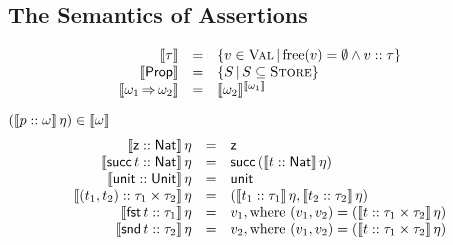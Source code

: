 \documentclass[12pt,a4paper]{article}
\begin{document}
\subsection{The Semantics of Assertions}

\begin{definition}
  \[\begin{array}{rcl}
  \llbracket\tau\rrbracket &=& \{v\in\textsc{Val}\,|\,\mathrm{free}(v)=\emptyset \wedge {v}\mathrel{::}{\tau}\} \\
  \llbracket\mathsf{Prop}\rrbracket &=& \{S\,|\,S \subseteq \textsc{Store}\} \\
  \llbracket\omega_1 \operatorname{\Rightarrow} \omega_2\rrbracket &=& \llbracket\omega_2\rrbracket^{\llbracket\omega_1\rrbracket}
  \end{array}\]
\end{definition}

$(\llbracket{p}\mathrel{::}{\omega}\rrbracket\,\eta) \in \llbracket\omega\rrbracket$
\[\begin{array}{rcl}
  \llbracket{\ensuremath{\mathsf{z}}}\mathrel{::}{\mathsf{Nat}}\rrbracket\,\eta &=& \mathsf{z} \\
  \llbracket{\ensuremath{\mathsf{succ}}\,{t}}\mathrel{::}{\mathsf{Nat}}\rrbracket\,\eta &=& \mathsf{succ}\,{(\llbracket{t}\mathrel{::}{\mathsf{Nat}}\rrbracket\,\eta)} \\
  \llbracket{\ensuremath{\mathsf{unit}}}\mathrel{::}{\mathsf{Unit}}\rrbracket\,\eta &=& \mathsf{unit} \\
  \llbracket{(t_1,t_2)}\mathrel{::}{\tau_1 \times \tau_2}\rrbracket\,\eta &=& (\llbracket{t_1}\mathrel{::}{\tau_1}\rrbracket\,\eta,\llbracket{t_2}\mathrel{::}{\tau_2}\rrbracket\,\eta) \\
  \llbracket{{\ensuremath{\mathsf{fst}}}\,{t}}\mathrel{::}{\tau_1}\rrbracket\,\eta &=& v_1, \text{where } (v_1,v_2) = (\llbracket{t}\mathrel{::}{\tau_1 \times \tau_2}\rrbracket\,\eta) \\
  \llbracket{{\ensuremath{\mathsf{snd}}}\,{t}}\mathrel{::}{\tau_2}\rrbracket\,\eta &=& v_2, \text{where } (v_1,v_2) = (\llbracket{t}\mathrel{::}{\tau_1 \times \tau_2}\rrbracket\,\eta) \\
\end{array}\]
\end{document}

